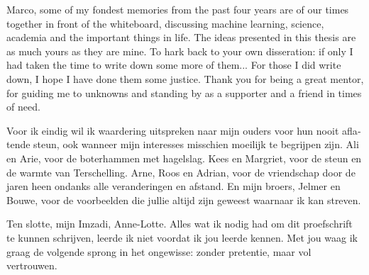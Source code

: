 Marco, some of my fondest memories from the past four years are of our times together in front of the whiteboard, discussing machine learning, science, academia and the important things in life. The ideas presented in this thesis are as much yours as they are mine. To hark back to your own disseration: if only I had taken the time to write down some more of them... For those I did write down, I hope I have done them some justice. Thank you for being a great mentor, for guiding me to unknowns and standing by as a supporter and a friend in times of need.
\vspace{3mm}

\begin{otherlanguage}{dutch}
Voor ik eindig wil ik waardering uitspreken naar mijn ouders voor hun nooit aflatende steun, ook wanneer mijn interesses misschien moeilijk te begrijpen zijn. Ali en Arie, voor de boterhammen met hagelslag. Kees en Margriet, voor de steun en de warmte van Terschelling. Arne, Roos en Adrian, voor de vriendschap door de jaren heen ondanks alle veranderingen en afstand. En mijn broers, Jelmer en Bouwe, voor de voorbeelden die jullie altijd zijn geweest waarnaar ik kan streven.

Ten slotte, mijn Imzadi, Anne-Lotte. Alles wat ik nodig had om dit proefschrift te kunnen schrijven, leerde ik niet voordat ik jou leerde kennen. Met jou waag ik graag de volgende sprong in het ongewisse: zonder pretentie, maar vol vertrouwen.
\end{otherlanguage}
